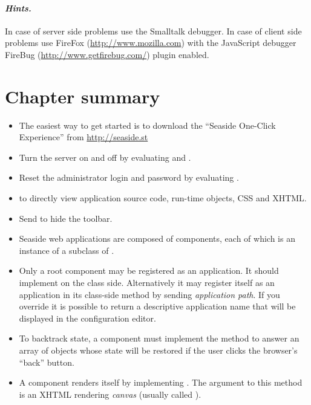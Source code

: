 \documentclass[a4paper,10pt,twoside]{book}
\begin{document}
{{\paragraph{\emph{Hints.}}
In case of server side problems use the Smalltalk debugger.
In case of client side problems use FireFox (\url{http://www.mozilla.com}) with the JavaScript debugger FireBug (\url{http://www.getfirebug.com/}) plugin enabled.

\section{Chapter summary}

\begin{itemize}
  \item The easiest way to get started is to download the ``Seaside One-Click Experience'' from \url{http://seaside.st}
  \item Turn the server on and off by evaluating  and .
  \item Reset the administrator login and password by evaluating .
  \item {} to directly view application source code, run-time objects, CSS and XHTML.
  \item Send  to hide the toolbar.
  \item Seaside web applications are composed of components, each of which is an instance of a subclass of .
  \item Only a root component may be registered as an application. It should implement  on the class side. Alternatively it may register itself as an application in its class-side  method by sending  \emph{application path}.
  If you override  it is possible to return a descriptive application name that will be displayed in the configuration editor.
  \item To backtrack state, a component must implement the  method to answer an array of objects whose state will be restored if the user clicks the browser's ``back'' button.
  \item A component renders itself by implementing .
  The argument to this method is an XHTML rendering \emph{canvas} (usually called ).

\end{itemize}}}
\end{document}
